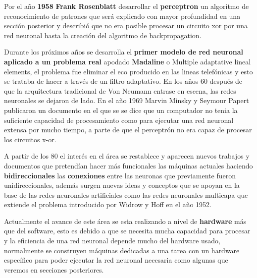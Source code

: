 \documentclass[a4paper, 11pt]{article} %
\begin{document}
Por el año \textbf{1958} \textbf{Frank Rosenblatt} desarrollar el \textbf{perceptron} un algoritmo de reconocimiento de patrones que será explicado con mayor profundidad en una sección posterior y describió que no era posible procesar un circuito xor por una red neuronal hasta la creación del algoritmo de backpropagation.

Durante los próximos años se desarrolla el \textbf{primer modelo de red neuronal aplicado a un problema real} apodado \textbf{Madaline} o Multiple adaptative lineal elements, el problema fue eliminar el eco producido en las lineas telefónicas y esto se trataba de hacer a través de un filtro adaptativo. En los años 60 después de que la arquitectura tradicional de Von Neumann entrase en escena, las redes neuronales se dejaron de lado. En el año 1969 Marvin Minsky y Seymour Papert publicaron un documento en el que se se dice que un computador no tenia la suficiente capacidad de procesamiento como para ejecutar una red neuronal extensa por mucho tiempo, a parte de que el perceptrón no era capaz de procesar los circuitos x-or.

A partir de los 80 el interés en el área se restablece y aparecen nuevos trabajos y documentos que pretendían hacer más funcionales las máquinas actuales haciendo \textbf{bidireccionales} las \textbf{conexiones} entre las neuronas que previamente fueron unidireccionales, además surgen nuevas ideas y conceptos que se apoyan en la base de las redes neuronales artificiales como las redes neuronales multicapa que extiende el problema introducido por Widrow y Hoff en el año 1952.

Actualmente el avance de este área se esta realizando a nivel de \textbf{hardware} más que del software, esto es debido a que se necesita mucha capacidad para procesar y la eficiencia de una red neuronal depende mucho del hardware usado, normalmente se construyen máquinas dedicadas a una tarea con un hardware específico para poder ejecutar la red neuronal necesaria como algunas que veremos en secciones posteriores.
\end{document}
